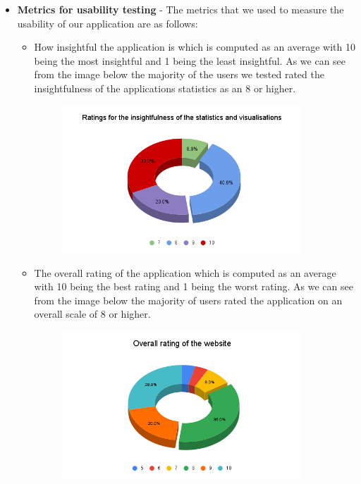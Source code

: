 \documentclass[12pt]{article}
\begin{document}
\begin{itemize}
    \item \textbf{Metrics for usability testing} - The metrics that we used to measure the usability of our application are as follows:
          \begin{itemize}
              \item How insightful the application is which is computed as an average with 10 being the most insightful and 1 being the least insightful. As we can see from the image below the majority of the users we tested rated the insightfulness of the applications statistics as an 8 or higher.
                    \begin{figure}[H]
                        \centering
                        \includegraphics[width=0.9\textwidth]{piechart.png}
                    \end{figure}
              \item The overall rating of the application which is computed as an average with 10 being the best rating and 1 being the worst rating. As we can see from the image below the majority of users rated the application on an overall scale of 8 or higher.
                    \begin{figure}[H]
                        \centering
                        \includegraphics[width=0.9\textwidth]{Overall rating of the website.png}

\end{figure}
\end{itemize}
\end{itemize}
\end{document}
